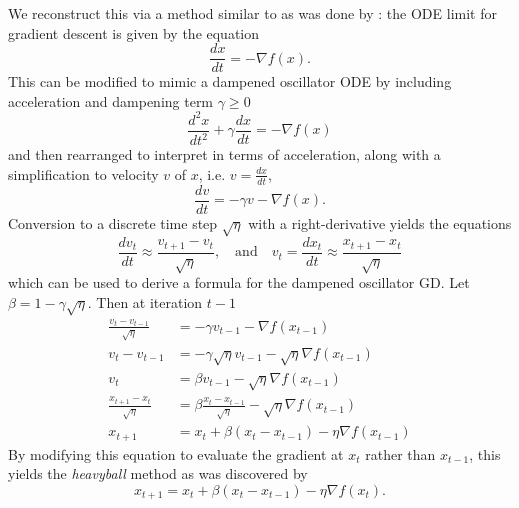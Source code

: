 \documentclass{article}
\newcommand{\dv}[2]{\frac{d #1}{d #2}}
\begin{document}
We reconstruct this via a method similar to as was done by
\citeauthor{10.1214/18-EJS1395}: the ODE limit for gradient descent is given by
the equation
\begin{equation}
    \dv{x}{t} = -\nabla f(x).
\end{equation}
This can be modified to mimic a dampened oscillator ODE by including acceleration
and dampening term $\gamma \geq 0$
\begin{equation}
    \dv{^2 x}{t^2}  + \gamma \dv{x}{t} = -\nabla f(x)
\end{equation}
and then rearranged to interpret in terms of acceleration, along with a
simplification to velocity $v$ of $x$, i.e.  $v = \dv{x}{t}$,
\begin{equation}
    \dv{v}{t}  =  -\gamma v -\nabla f(x).
\end{equation}
Conversion to a discrete time step $\sqrt{\eta}$ with a right-derivative yields the equations
\begin{equation}
    \label{eq:der}
    \dv{v_t}{t} \approx \frac{v_{t + 1} - v_t}{\sqrt{\eta}}, \quad \text{and}
    \quad v_{t} = \dv{x_t}{t} \approx \frac{x_{t + 1} - x_t}{\sqrt{\eta}}
\end{equation}
which can be used to derive a formula for the dampened oscillator GD. Let $\beta
= 1 - \gamma \sqrt{\eta}$. Then at iteration $t - 1$
\begin{equation}
    \label{eq:formula}
    \begin{aligned}
        \frac{v_{t} - v_{t - 1}}{\sqrt{\eta}} &= -\gamma v_{t - 1} -\nabla
        f(x_{t - 1}) \\
        v_{t} - v_{t - 1} &= -\gamma\sqrt\eta v_{t - 1} -\sqrt \eta \nabla
        f(x_{t - 1}) \\
        v_{t} &= \beta v_{t - 1} - \sqrt{\eta} \nabla f(x_{t - 1})\\
        \frac{x_{t + 1} - x_t}{\sqrt{\eta}} &= \beta \frac{x_{t}
        - x_{t - 1}}{\sqrt{\eta}} - \sqrt{\eta} \nabla f(x_{t - 1}) \\
        x_{t + 1} &= x_t + \beta (x_{t} - x_{t - 1}) - \eta \nabla f(x_{t - 1})
    \end{aligned}
\end{equation}
By modifying this equation to evaluate the gradient at $x_t$ rather
than $x_{t - 1}$, this yields the \emph{heavyball} method as was discovered by
\citeauthor{heavyball}
\begin{equation}
    \label{eq:heavyball}
        x_{t + 1} = x_t + \beta (x_{t} - x_{t - 1}) - \eta \nabla f(x_t).
\end{equation}
\end{document}
